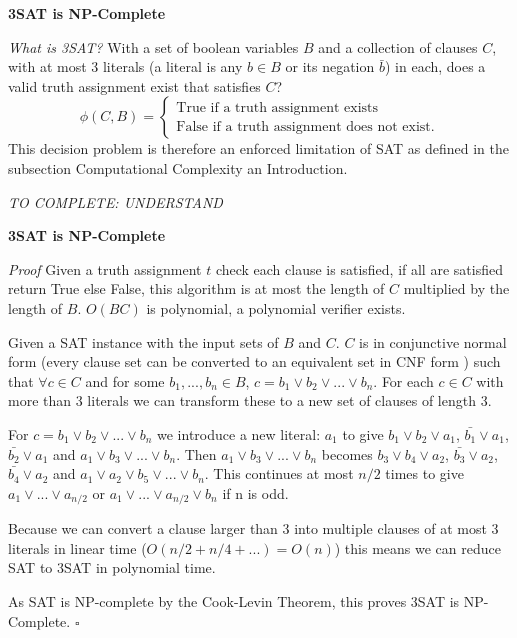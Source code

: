\documentclass[a4paper,12pt]{article}
\begin{document}
\textbf{3SAT is NP-Complete}

\textit{What is 3SAT?} With a set of boolean variables $B$ and a collection of clauses $C$, with at most 3 literals (a literal is any $b \in B$ or its negation $\bar{b}$) in each, does a valid truth assignment exist that satisfies $C$?
		\begin{equation}
		        \phi (C,B) = \begin{cases}
		            \text{True if a truth assignment exists} \\
		            \text{False if a truth assignment does not exist}.
				\end{cases}
		\end{equation}
This decision problem is therefore an enforced limitation of SAT as defined in the subsection Computational Complexity an Introduction.

 \textit{TO COMPLETE: UNDERSTAND \cite{tripartite to sat}}

\textbf{3SAT is NP-Complete}

\textit{Proof}
Given a truth assignment $t$ check each clause is satisfied, if all are satisfied return True else False, this algorithm is at most the length of $C$ multiplied by the length of $B$. $O(BC)$ is polynomial, a polynomial verifier exists. 

Given a SAT instance with the input sets of $B$ and $C$. $C$ is in conjunctive normal form (every clause set can be converted to an equivalent set in CNF form \cite{CNF}) such that $\forall c \in C$ and for some $b_1, ... ,b_n \in B$, $c = b_1 \lor b_2 \lor ... \lor b_n$. For each $c \in C$ with more than 3 literals we can transform these to a new set of clauses of length 3. 

For $c = b_1 \lor b_2 \lor ... \lor b_n$ we introduce a new literal: $a_1$ to give $b_1 \lor b_2 \lor a_1$, $\bar{b_1} \lor a_1$, $\bar{b_2} \lor a_1$ and $a_1 \lor b_3 \lor ... \lor b_n$. Then $a_1 \lor b_3 \lor ... \lor b_n$ becomes $b_3 \lor b_4 \lor a_2$, $\bar{b_3} \lor a_2$, $\bar{b_4} \lor a_2$ and $a_1 \lor a_2 \lor b_5 \lor ... \lor b_n$. This continues at most $n/2$ times to give $a_1 \lor ... \lor a_{n/2}$ or $a_1 \lor ... \lor a_{n/2} \lor b_n$ if n is odd. 

Because we can convert a clause larger than 3 into multiple clauses of at most 3 literals in linear time ($O(n/2 + n/4 + ...) = O(n)$) this means we can reduce SAT to 3SAT in polynomial time. 

As SAT is NP-complete by the Cook-Levin Theorem, this proves 3SAT is NP-Complete. $\square$
		
\end{document}
